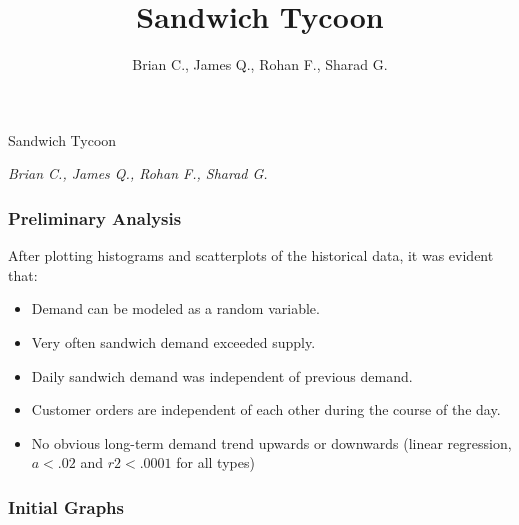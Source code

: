 \documentclass[]{article}
\title{Sandwich Tycoon}
\author{Brian C., James Q., Rohan F., Sharad G.}
\date{}
\begin{document}
\begin{center}
\huge Sandwich Tycoon \\[0.2cm]
\end{center}
\begin{center}
\large \emph{Brian C., James Q., Rohan F., Sharad G.}\\[0.1cm]
\end{center}
\normalsize


\subsubsection{Preliminary Analysis}\label{preliminary-analysis}

After plotting histograms and scatterplots of the historical data, it
was evident that:

\begin{itemize}
\itemsep1pt\parskip0pt
\item
  Demand can be modeled as a random variable.
\item
  Very often sandwich demand exceeded supply.
\item
  Daily sandwich demand was independent of previous demand.
\item
  Customer orders are independent of each other during the course of the
  day.
\item
  No obvious long-term demand trend upwards or downwards (linear
  regression, $a<.02$ and $r2<.0001$ for all types)
\end{itemize}

\subsubsection{Initial Graphs}\label{initial-graphs}
\end{document}
